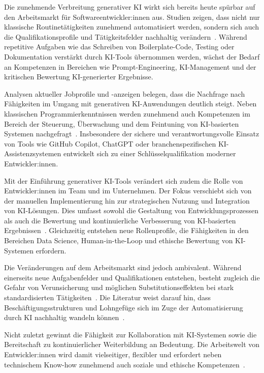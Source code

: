 
Die zunehmende Verbreitung generativer KI wirkt sich bereits heute spürbar auf
den Arbeitsmarkt für Softwareentwickler:innen aus. Studien zeigen, dass nicht
nur klassische Routinetätigkeiten zunehmend automatisiert werden, sondern sich
auch die Qualifikationsprofile und Tätigkeitsfelder nachhaltig
verändern~\cite{siebert_generative_2024,braun_ki_2024,s_future_2024}. Während
repetitive Aufgaben wie das Schreiben von Boilerplate-Code, Testing oder
Dokumentation verstärkt durch KI-Tools übernommen werden, wächst der Bedarf an
Kompetenzen in Bereichen wie Prompt-Engineering, KI-Management und der
kritischen Bewertung KI-generierter Ergebnisse.

Analysen aktueller Jobprofile und -anzeigen belegen, dass die Nachfrage nach
Fähigkeiten im Umgang mit generativen KI-Anwendungen deutlich steigt. Neben
klassischen Programmierkenntnissen werden zunehmend auch Kompetenzen im Bereich
der Steuerung, Überwachung und dem Feintuning von KI-basierten Systemen
nachgefragt~\cite{ahmadi_generative_2024}. Insbesondere der sichere und
verantwortungsvolle Einsatz von Tools wie GitHub Copilot, ChatGPT oder
branchenspezifischen KI-Assistenzsystemen entwickelt sich zu einer
Schlüsselqualifikation moderner Entwickler:innen.

Mit der Einführung generativer KI-Tools verändert sich zudem die Rolle von
Entwickler:innen im Team und im Unternehmen. Der Fokus verschiebt sich von der
manuellen Implementierung hin zur strategischen Nutzung und Integration von
KI-Lösungen. Dies umfasst sowohl die Gestaltung von Entwicklungsprozessen als
auch die Bewertung und kontinuierliche Verbesserung von KI-basierten
Ergebnissen~\cite{storey_generative_2025}. Gleichzeitig entstehen neue
Rollenprofile, die Fähigkeiten in den Bereichen Data Science, Human-in-the-Loop
und ethische Bewertung von KI-Systemen erfordern.

Die Veränderungen auf dem Arbeitsmarkt sind jedoch ambivalent. Während
einerseits neue Aufgabenfelder und Qualifikationen entstehen, besteht zugleich
die Gefahr von Verunsicherung und möglichen Substitutionseffekten bei stark
standardisierten Tätigkeiten~\cite{farach_evolving_2025}. Die Literatur weist
darauf hin, dass Beschäftigungsstrukturen und Lohngefüge sich im Zuge der
Automatisierung durch KI nachhaltig wandeln
können~\cite{marguerit_augmenting_2025}.

Nicht zuletzt gewinnt die Fähigkeit zur Kollaboration mit KI-Systemen sowie die
Bereitschaft zu kontinuierlicher Weiterbildung an Bedeutung. Die Arbeitswelt
von Entwickler:innen wird damit vielseitiger, flexibler und erfordert neben
technischem Know-how zunehmend auch soziale und ethische
Kompetenzen~\cite{storey_generative_2025,siebert_generative_2024}.


